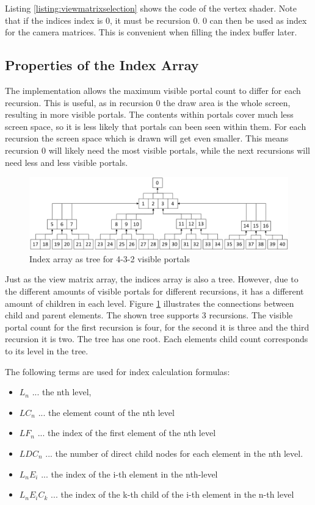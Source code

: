 Listing \ref{listing:viewmatrixselection} shows the code of the vertex shader. Note that if the indices index is 0, it must be recursion 0. 0 can then be used as index for the camera matrices. This is convenient when filling the index buffer later.

\subsection{Properties of the Index Array}
\label{section:indexarrayproperties}

The implementation allows the maximum visible portal count to differ for each recursion. This is useful, as in recursion 0 the draw area is the whole screen, resulting in more visible portals. The contents within portals cover much less screen space, so it is less likely that portals can been seen within them. For each recursion the screen space which is drawn will get even smaller. This means recursion 0 will likely need the most visible portals, while the next recursions will need less and less visible portals.

\begin{figure}[h]
	\includegraphics[width=\linewidth]{images/indexarray.png}
	\caption{Index array as tree for 4-3-2 visible portals}
	\label{fig:indexarray}
\end{figure}

Just as the view matrix array, the indices array is also a tree. However, due to the different amounts of visible portals for different recursions, it has a different amount of children in each level. Figure \ref{fig:indexarray} illustrates the connections between child and parent elements. The shown tree supports 3 recursions. The visible portal count for the first recursion is four, for the second it is three and the third recursion it is two. The tree has one root. Each elements child count corresponds to its level in the tree.

The following terms are used for index calculation formulas:
\begin{itemize}
	\item $L_n$ ... the nth level,
	\item $LC_n$ ... the element count of the nth level
	\item $LF_n$ ... the index of the first element of the nth level
	\item $LDC_n$ ... the number of direct child nodes for each element in the nth level. 
	\item $L_nE_i$ ... the index of the i-th element in the nth-level
	\item $L_nE_iC_k$ ... the index of the k-th child of the i-th element in the n-th level 
\end{itemize}

